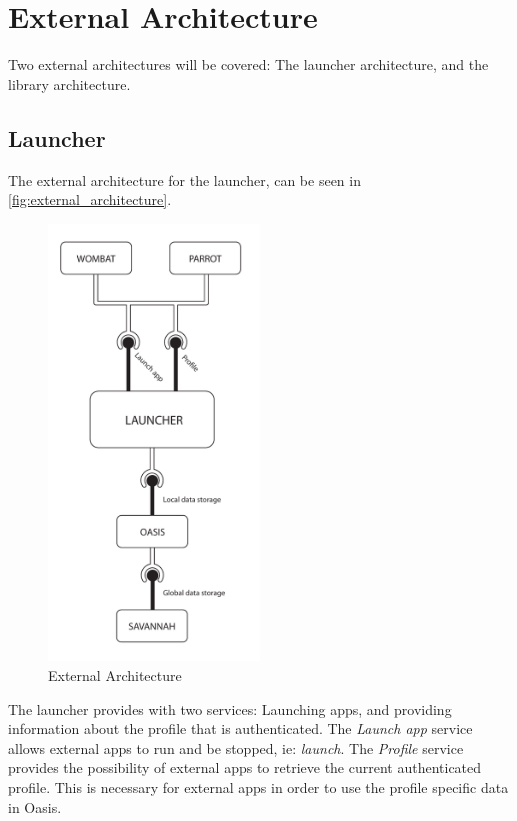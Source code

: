 \section{External Architecture}
Two external architectures will be covered: The launcher architecture, and the \guicomponents[] library architecture.

\subsection{Launcher}
\label{sec:launcher_architecture}
The external architecture for the launcher, can be seen in \autoref{fig:external_architecture}.
\begin{figure}[h]
	\centering
	\includegraphics[width=0.5\textwidth]{gfx/external_architecture.pdf}
	\caption{External Architecture}
	\label{fig:external_architecture}
\end{figure}
The launcher provides with two services: Launching apps, and providing information about the profile that is authenticated. The \textit{Launch app} service allows external apps to run and be stopped, ie: \textit{launch}.
The \textit{Profile} service provides the possibility of external apps to retrieve the current authenticated profile.
This is necessary for external apps in order to use the profile specific data in Oasis.

